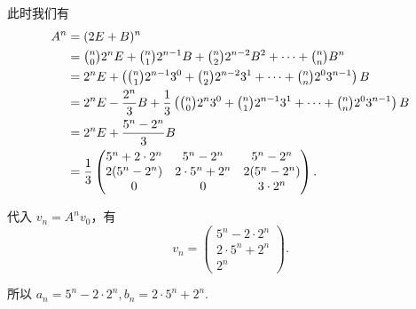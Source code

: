 \documentclass[UTF8,12pt,a4paper,fontset=fandol]{ctexart}
\begin{document}
\begin{solve}
            此时我们有
            \begin{align*}
                A^n &= (2E + B)^n \\
                    &= \tbinom{n}{0} 2^n E + \tbinom{n}{1} 2^{n-1} B + \tbinom{n}{2} 2^{n-2} B^2 + \cdots + \tbinom{n}{n} B^n \\
                    &= 2^n E + \left(\tbinom{n}{1} 2^{n-1} 3^0 + \tbinom{n}{2} 2^{n-2} 3^1 + \cdots + \tbinom{n}{n} 2^0 3^{n-1} \right) B \\
                    &= 2^n E - \frac{2^n}{3} B + \frac{1}{3} \left(\tbinom{n}{0} 2^n 3^0 + \tbinom{n}{1} 2^{n-1} 3^1 + \cdots + \tbinom{n}{n} 2^0 3^{n-1} \right) B \\
                    &= 2^n E + \frac{5^n - 2^n}{3} B \\
                    &= \frac{1}{3} \begin{pmatrix}
                        5^n + 2 \cdot 2^n & 5^n - 2^n         & 5^n - 2^n    \\
                        2(5^n - 2^n)      & 2 \cdot 5^n + 2^n & 2(5^n - 2^n) \\
                        0                 & 0                 & 3 \cdot 2^n
                    \end{pmatrix}.
            \end{align*}

            代入 $v_n = A^n v_0$，有
            \[
                v_n = \begin{pmatrix}
                    5^n - 2 \cdot 2^n \\
                    2 \cdot 5^n + 2^n \\
                    2^n
                \end{pmatrix}.
            \]

            所以 $a_n = 5^n - 2 \cdot 2^n, b_n = 2 \cdot 5^n + 2^n$.
\end{solve}
\end{document}
